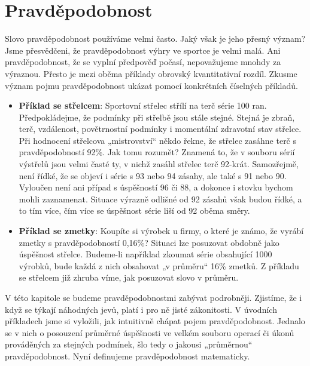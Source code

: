     
    \cite[s.~7]{polak1991matematika}
    
  \section{Pravděpodobnost}\label{mai:IchapIIIsecII}
    Slovo pravděpodobnost používáme velmi často. Jaký však je jeho přesný význam? Jsme přesvědčeni, 
    že pravděpodobnost výhry ve sportce je velmi malá. Ani pravděpodobnost, že se vyplní předpověď 
    počasí, nepovažujeme mnohdy za výraznou. Přesto je mezi oběma příklady obrovský kvantitativní 
    rozdíl. Zkusme význam pojmu pravděpodobnost ukázat pomocí konkrétních číselných příkladů.
  
    \begin{itemize}
      \item \textbf{Příklad se střelcem}: Sportovní střelec střílí na terč série \num{100} ran. 
            Předpokládejme, že podmínky při střelbě jsou stále stejné. Stejná je zbraň, terč, 
            vzdálenost, povětrnostní podmínky i momentální zdravotní stav střelce. Při hodnocení 
            střelcova „mistrovství“ někdo řekne, že střelec zasáhne terč s pravděpodobností 
            \num{92}\%. Jak tomu rozumět? Znamená to, že v souboru sérií výstřelů jsou velmi časté 
            ty, v nichž zasáhl střelec terč \num{92}-krát. Samozřejmě, není řídké, že se objeví i 
            série s \num{93} nebo \num{94} zásahy, ale také s \num{91} nebo \num{90}. Vyloučen není 
            ani případ s úspěšností \num{96} či \num{88}, a dokonce i stovku bychom mohli 
            zaznamenat. Situace výrazně odlišné od \num{92} zásahů však budou řídké, a to tím více, 
            čím více se úspěšnost série liší od \num{92} oběma směry.
      \item \textbf{Příklad se zmetky}: Koupíte si výrobek u firmy, o které je známo, že vyrábí 
            zmetky s pravděpodobností 0,16\%? Situaci lze posuzovat obdobně jako úspěšnost střelce. 
            Budeme-li například zkoumat série obsahující 1000 výrobků, bude každá z nich obsahovat 
            „v průměru“ 16\% zmetků. Z příkladu se střelcem již zhruba víme, jak posuzovat slovo v 
            průměru.
    \end{itemize}
    
    V této kapitole se budeme pravděpodobnostmi zabývat podrobněji. Zjistíme, že i když se týkají 
    náhodných jevů, platí i pro ně jisté zákonitosti. V úvodních příkladech jsme si vyložili, jak 
    intuitivně chápat pojem pravděpodobnost. Jednalo se v nich o posouzení průměrné úspěšnosti ve 
    velkém souboru operací či úkonů prováděných za stejných podmínek, šlo tedy o jakousi 
    „průměrnou“ pravděpodobnost. Nyní definujeme pravděpodobnost matematicky.
    
